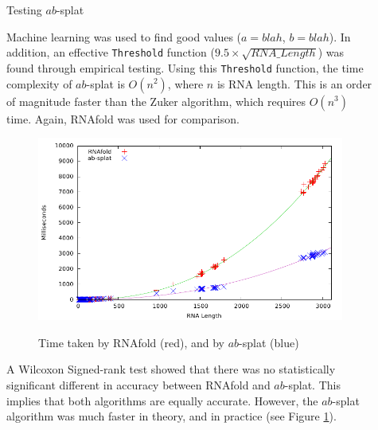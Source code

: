 \documentclass[final]{beamer}
\newlength{\sepwid}
\newlength{\onecolwid}
\begin{document}
\begin{frame}[t]
\begin{columns}[t]
\begin{column}{\onecolwid}
    
    \end{column}    
    
    

 \begin{column}{\sepwid}\end{column}			%
    \begin{column}{\onecolwid}
    
        \begin{block}{Testing $ab$-splat}


Machine learning was used to find good values ($a = blah$, $b = blah$). In addition, an effective \texttt{Threshold} function ($9.5 \times \sqrt{RNA\_Length}$) was found through empirical testing. Using this \texttt{Threshold} function, the time complexity of $ab$-splat is $O(n^2)$, where $n$ is RNA length. This is an order of magnitude faster than the Zuker algorithm, which requires $O(n^3)$ time. Again, RNAfold was used for comparison.
       \vspace{0.25in}
        \begin{figure}
          \begin{center}
            \includegraphics[width=10in]{zukerabtime.pdf} \\
            \caption{Time taken by RNAfold (red), and by $ab$-splat (blue)}
            \label{fig:zukerabtime}
          \end{center}
        \end{figure}
A Wilcoxon Signed-rank test showed that there was no statistically significant different in accuracy between RNAfold and $ab$-splat. This implies that both algorithms are equally accurate. However, the $ab$-splat algorithm was much faster in theory, and in practice (see Figure \ref{fig:zukerabtime}).   
         

\end{block}
\end{column}
\end{columns}
\end{frame}
\end{document}
